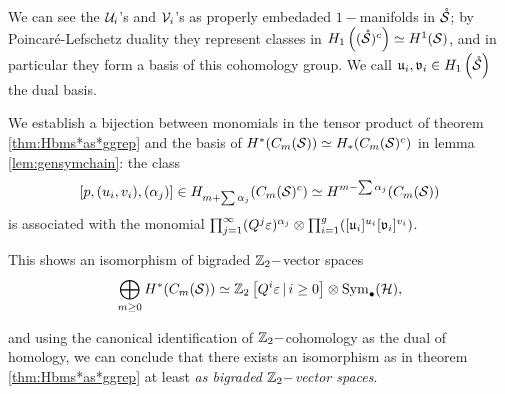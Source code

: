
\begin{defn}
 \label{defn:dualHbasis}
We can see the $\mathcal{U}_i$'s and $\mathcal{V}_i$'s as properly embedaded $1-$manifolds in $\mathring{\mathcal{S}}$;
by Poincaré-Lefschetz duality they represent classes in $H_1\left((\mathring{\mathcal{S}})^c\right)\simeq H^1(\mathcal{S})$,
and in particular they form a basis
of this cohomology group. We call $\mathfrak{u}_i,\mathfrak{v}_i\in H_1\left(\mathring{\mathcal{S}}\right)$ the dual basis.

\end{defn}
We establish a bijection between monomials in the tensor product of theorem  \ref{thm:Hbms*as*ggrep}
and the basis of $H^*(C_m(\mathcal{S}))\simeq H_*(C_m(\mathcal{S})^c)$ in lemma \ref{lem:gensymchain}:
the class 
\[
[p,(u_i,v_i),(\alpha_j)]\in H_{m+\sum\alpha_j}(C_m(\mathcal{S})^c)\simeq H^{m-\sum\alpha_j}(C_m(\mathcal{S}))
\]
is associated with the monomial $\prod_{j=1}^{\infty}(Q^j\varepsilon)^{\alpha_j}\otimes \prod_{i=1}^g([\mathfrak{u}_i]^{u_i}[\mathfrak{v}_i]^{v_i})$.

This shows an isomorphism of bigraded $\mathbb{Z}_2-$vector spaces
\begin{equation}\label{eq:isovectorspaces}
  \bigoplus_{m\geq 0} H^*(C_m(\mathcal{S}))\simeq \mathbb{Z}_2\left[Q^i\varepsilon\,|\, i\geq 0\right]\otimes\operatorname{Sym}_{\bullet}(\mathcal{H}),
\end{equation}

and using the canonical identification of $\mathbb{Z}_2-$cohomology as the dual of homology, we can
conclude that there exists an isomorphism as in theorem \ref{thm:Hbms*as*ggrep}
at least \emph{as bigraded $\mathbb{Z}_2-$vector spaces}.
